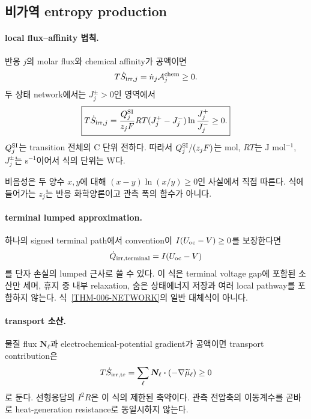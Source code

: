 \subsection{비가역 entropy production}\label{THM-CH2-IRREVERSIBLE}

\paragraph{ local flux--affinity 법칙.}
반응 $j$의 molar flux와 chemical affinity가 공액이면
\begin{equation}
T\dot S_{\mathrm{irr},j}
=\dot n_j\mathcal A_j^{\mathrm{chem}}\ge0.
\label{THM-006-LOCAL}
\end{equation}
두 상태 network에서는 $J_j^\pm>0$인 영역에서
\begin{equation}
\boxed{
T\dot S_{\mathrm{irr},j}
=\frac{Q_j^{\rm SI}}{z_jF}RT
(J_j^+-J_j^-)
\ln\frac{J_j^+}{J_j^-}\ge0.
}
\label{THM-006-NETWORK}
\end{equation}
$Q_j^{\rm SI}$는 transition 전체의 C 단위 전하다. 따라서
$Q_j^{\rm SI}/(z_jF)$는 mol, $RT$는 J mol$^{-1}$,
$J_j^\pm$는 s$^{-1}$이어서 식의 단위는 W다.

비음성은 두 양수 $x,y$에 대해
$(x-y)\ln(x/y)\ge0$인 사실에서 직접 따른다. 식에 들어가는
$z_j$는 반응 화학양론이고 관측 폭의 함수가 아니다.

\paragraph{ terminal lumped approximation.}
하나의 signed terminal path에서 convention이
$I(U_{\rm oc}-V)\ge0$를 보장한다면
\begin{equation}
\dot Q_{\mathrm{irr},\rm terminal}=I(U_{\rm oc}-V)
\label{THM-007-EQUATION}
\end{equation}
를 단자 손실의 lumped 근사로 쓸 수 있다. 이 식은 terminal
voltage gap에 포함된 소산만 세며, 휴지 중 내부 relaxation,
숨은 상태에너지 저장과 여러 local pathway를 포함하지 않는다.
식~\eqref{THM-006-NETWORK}의 일반 대체식이 아니다.

\paragraph{ transport 소산.}
물질 flux $\bm N_\ell$과 electrochemical-potential gradient가
공액이면 transport contribution은
\[
T\dot S_{\mathrm{irr},\mathrm{tr}}
=\sum_\ell \bm N_\ell\boldsymbol{\cdot}
(-\nabla\widetilde\mu_\ell)\ge0
\]
로 둔다. 선형응답의 $I^2R$은 이 식의 제한된 축약이다. 관측
전압축의 이동계수를 곧바로 heat-generation resistance로
동일시하지 않는다.

